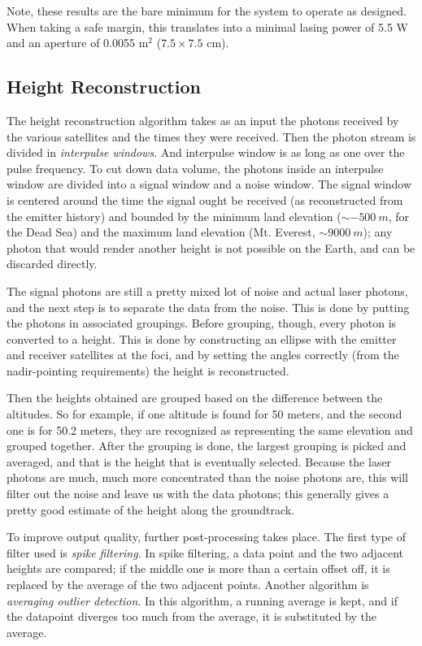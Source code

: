 Note, these results are the bare minimum for the system to operate as designed. When taking a safe margin, this translates into a minimal lasing power of 5.5 W and an aperture of 0.0055 m$^2$ ($7.5\times7.5$ cm). 

\subsection{Height Reconstruction}
\label{sec:HeightReconstruction}

The height reconstruction algorithm takes as an input the photons received by the various satellites and the times they were received. Then the photon stream is divided in \emph{interpulse windows}. And interpulse window is as long as one over the pulse frequency. To cut down data volume, the photons inside an interpulse window are divided into a signal window and a noise window. The signal window is centered around the time the signal ought be received (as reconstructed from the emitter history) and bounded by the minimum land elevation ($\sim -500\ m$, for the Dead Sea) and the maximum land elevation (Mt. Everest, $\sim 9000\ m$); any photon that would render another height is not possible on the Earth, and can be discarded directly.

The signal photons are still a pretty mixed lot of noise and actual laser photons, and the next step is to separate the data from the noise. This is done by putting the photons in associated groupings. Before grouping, though, every photon is converted to a height. This is done by constructing an ellipse with the emitter and receiver satellites at the foci, and by setting the angles correctly (from the nadir-pointing requirements) the height is reconstructed.

Then the heights obtained are grouped based on the difference between the altitudes. So for example, if one altitude is found for 50 meters, and the second one is for 50.2 meters, they are recognized as representing the same elevation and grouped together. After the grouping is done, the largest grouping is picked and averaged, and that is the height that is eventually selected. Because the laser photons are much, much more concentrated than the noise photons are, this will filter out the noise and leave us with the data photons; this generally gives a pretty good estimate of the height along the groundtrack.

To improve output quality, further post-processing takes place. The first type of filter used is \emph{spike filtering}. In spike filtering, a data point and the two adjacent heights are compared; if the middle one is more than a certain offset off, it is replaced by the average of the two adjacent points. Another algorithm is \emph{averaging outlier detection}. In this algorithm, a running average is kept, and if the datapoint diverges too much from the average, it is substituted by the average.

